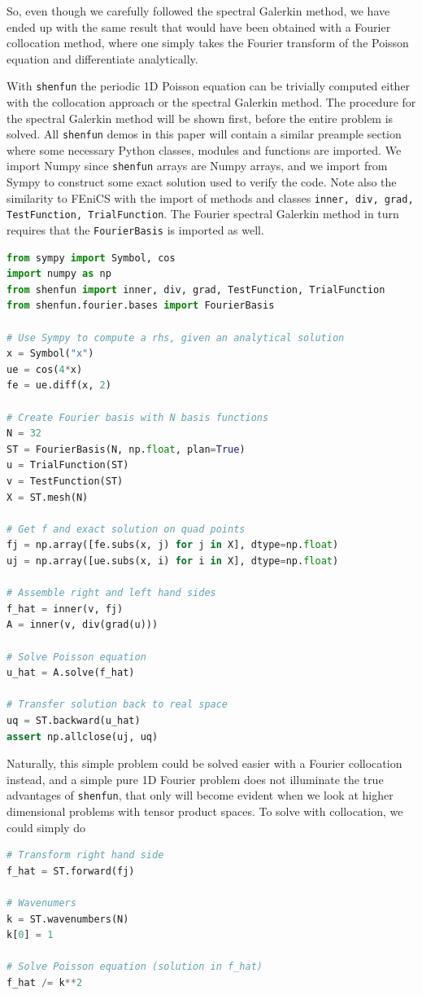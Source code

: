 \documentclass[%
oneside,                 %
final,                   %
10pt]{article}
\begin{document}
So, even though we carefully followed the spectral Galerkin method, we have ended up with the same result that would have been obtained with a Fourier collocation method, where one simply takes the Fourier transform of the Poisson equation and differentiate analytically.

With \texttt{shenfun} the periodic 1D Poisson equation can be trivially computed either with the collocation approach or the spectral Galerkin method. The procedure for the spectral Galerkin method will be shown first, before the entire problem is solved. All \texttt{shenfun} demos in this paper will contain a similar preample section where some necessary Python classes, modules and functions are imported. We import Numpy since \texttt{shenfun} arrays are Numpy arrays, and we import from Sympy to construct some exact solution used to verify the code. Note also the similarity to FEniCS with the import of methods and classes \texttt{inner, div, grad, TestFunction, TrialFunction}.  The Fourier spectral Galerkin method in turn requires that the \texttt{FourierBasis} is imported as well. 
\begin{lstlisting}[language=Python,style=yellow2_fb]
from sympy import Symbol, cos
import numpy as np
from shenfun import inner, div, grad, TestFunction, TrialFunction
from shenfun.fourier.bases import FourierBasis

# Use Sympy to compute a rhs, given an analytical solution
x = Symbol("x")
ue = cos(4*x)
fe = ue.diff(x, 2)

# Create Fourier basis with N basis functions
N = 32
ST = FourierBasis(N, np.float, plan=True)
u = TrialFunction(ST)
v = TestFunction(ST)
X = ST.mesh(N)

# Get f and exact solution on quad points 
fj = np.array([fe.subs(x, j) for j in X], dtype=np.float)
uj = np.array([ue.subs(x, i) for i in X], dtype=np.float)

# Assemble right and left hand sides
f_hat = inner(v, fj)
A = inner(v, div(grad(u)))

# Solve Poisson equation
u_hat = A.solve(f_hat)

# Transfer solution back to real space
uq = ST.backward(u_hat)
assert np.allclose(uj, uq)
\end{lstlisting}

Naturally, this simple problem could be solved easier with a Fourier collocation instead, and  a simple pure 1D Fourier problem does not illuminate the true advantages of  \texttt{shenfun}, that only will become evident when we look at higher dimensional problems with tensor product spaces. To solve with collocation, we could simply do
\begin{lstlisting}[language=Python,style=yellow2_fb]
# Transform right hand side
f_hat = ST.forward(fj)

# Wavenumers
k = ST.wavenumbers(N)
k[0] = 1

# Solve Poisson equation (solution in f_hat)
f_hat /= k**2
\end{lstlisting}
\end{document}
